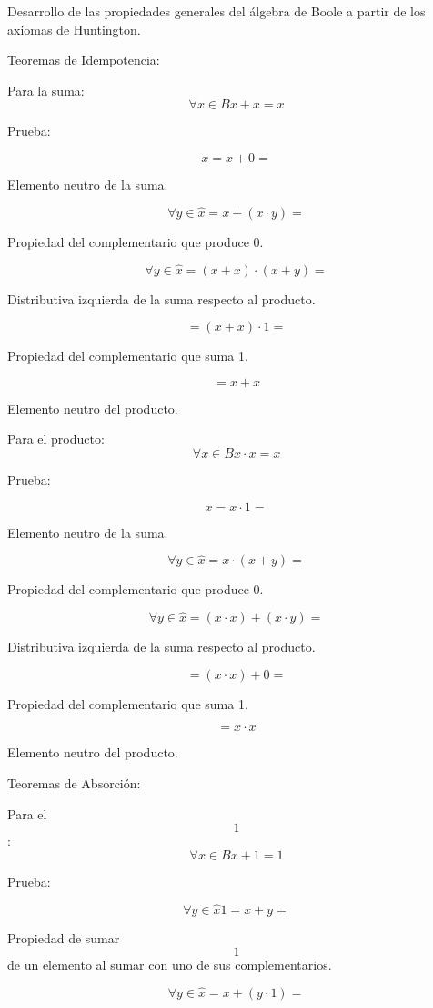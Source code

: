 Desarrollo de las propiedades generales del álgebra de Boole a partir de
los axiomas de Huntington.

Teoremas de Idempotencia:

Para la suma: \[\forall{x \in B}{{x + x} = x}\]

Prueba:

\[{x = {x + 0}} =\]

Elemento neutro de la suma.

\[\forall{y \in \widehat{x}}{{= {x + {({x \cdot y})}}} =}\]

Propiedad del complementario que produce 0.

\[\forall{y \in \widehat{x}}{{= {{({x + x})} \cdot {({x + y})}}} =}\]

Distributiva izquierda de la suma respecto al producto.

\[{= {{({x + x})} \cdot 1}} = {}\]

Propiedad del complementario que suma 1.

\[= {x + x}\]

Elemento neutro del producto.

Para el producto: \[\forall{x \in B}{{x \cdot x} = x}\]

Prueba:

\[{x = {x \cdot 1}} =\]

Elemento neutro de la suma.

\[\forall{y \in \widehat{x}}{{= {x \cdot {({x + y})}}} =}\]

Propiedad del complementario que produce 0.

\[\forall{y \in \widehat{x}}{{= {{({x \cdot x})} + {({x \cdot y})}}} =}\]

Distributiva izquierda de la suma respecto al producto.

\[{= {{({x \cdot x})} + 0}} = {}\]

Propiedad del complementario que suma 1.

\[= {x \cdot x}\]

Elemento neutro del producto.

Teoremas de Absorción:

Para el \[1\]: \[\forall{x \in B}{{x + 1} = 1}\]

Prueba:

\[\forall{y \in \widehat{x}}{{1 = {x + y}} =}\]

Propiedad de sumar \[1\] de un elemento al sumar con uno de sus
complementarios.

\[\forall{y \in \widehat{x}}{{= {x + {({y \cdot 1})}}} =}\]

